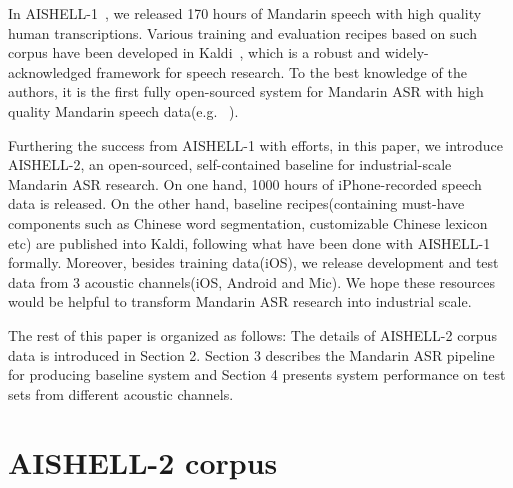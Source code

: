 \documentclass[a4paper]{article}
\begin{document}
In AISHELL-1~\cite{aishell1}, we released 170 hours of Mandarin speech with high quality human transcriptions.
Various training and evaluation recipes based on such corpus have been developed in Kaldi~\cite{kaldi}, which is a robust and widely-acknowledged framework for speech research.
To the best knowledge of the authors, it is the first fully open-sourced system for Mandarin ASR with high quality Mandarin speech data(e.g. ~\cite{do2017, do2018_1, do2018_2}).

Furthering the success from AISHELL-1 with efforts, in this paper, we introduce AISHELL-2, an open-sourced, self-contained baseline for industrial-scale Mandarin ASR research.
On one hand, 1000 hours of iPhone-recorded speech data is released. On the other hand, baseline recipes(containing must-have components such as Chinese word segmentation, customizable Chinese lexicon etc) are published into Kaldi, following what have been done with AISHELL-1 formally.
Moreover, besides training data(iOS), we release development and test data from 3 acoustic channels(iOS, Android and Mic).
We hope these resources would be helpful to transform Mandarin ASR research into industrial scale.

The rest of this paper is organized as follows: The details of AISHELL-2 corpus data is introduced in Section 2.
Section 3 describes the Mandarin ASR pipeline for producing baseline system and Section 4
presents system performance on test sets from different acoustic channels.

\section{AISHELL-2 corpus}
\end{document}
